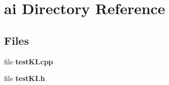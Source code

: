\section{ai Directory Reference}
\label{dir_eb8cc02461988d7ac71e6ab0aa3c7205}
\subsection*{Files}
\begin{DoxyCompactItemize}
\item 
file {\bfseries test\-K\-I.\-cpp}
\item 
file {\bfseries test\-K\-I.\-h}
\end{DoxyCompactItemize}
